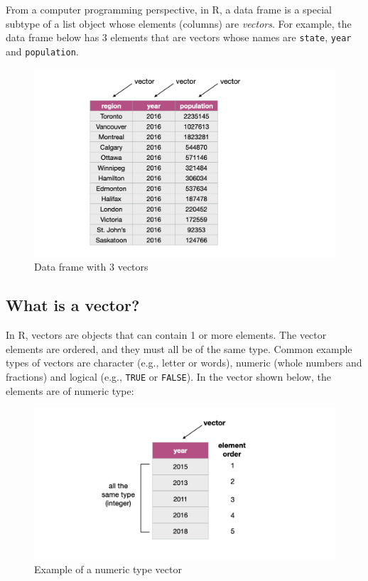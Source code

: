 \documentclass[
]{krantz}
\begin{document}
From a computer programming perspective, in R, a data frame is a special subtype of a list object whose elements (columns) are \emph{vectors}.
For example, the data frame below has 3 elements that are vectors whose names are \texttt{state}, \texttt{year} and \texttt{population}.

\begin{figure}
\includegraphics[width=1\linewidth]{img/vectors} \caption{Data frame with 3 vectors}\label{fig:02-vectors}
\end{figure}

\hypertarget{what-is-a-vector}{%
\subsection{What is a vector?}\label{what-is-a-vector}}

In R, vectors are objects that can contain 1 or more elements. The vector elements are ordered, and they must all be of the same type. Common
example types of vectors are character (e.g., letter or words), numeric (whole numbers and fractions) and logical (e.g., \texttt{TRUE} or \texttt{FALSE}). In
the vector shown below, the elements are of numeric type:

\begin{figure}
\includegraphics[width=1\linewidth]{img/vector} \caption{Example of a numeric type vector}\label{fig:02-vector}
\end{figure}
\end{document}
